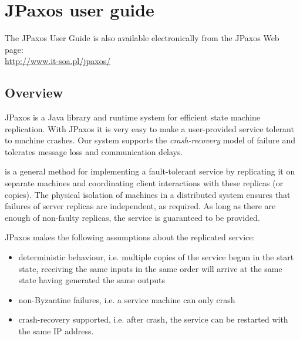 \chapter{JPaxos user guide}

The JPaxos User Guide is also available electronically from the JPaxos Web page:\\ \url{http://www.it-soa.pl/jpaxos/}

\section{Overview}
\label{overview:overview}\label{overview::doc}\label{overview:jpaxos-user-guide}
JPaxos is a Java library and runtime system for efficient state machine
replication. \linebreak With JPaxos it is very easy to make a user-provided
service tolerant to machine crashes. Our system supports the \emph{crash-recovery}
model of failure and tolerates message loss and communication delays.
\begin{description}
\item[{\href{http://en.wikipedia.org/wiki/State\_machine\_replication}{State machine replication}}] \leavevmode{}\label{overview:term-state-machine-replication}
is a general method for implementing a fault-tolerant service by
replicating it on separate machines and coordinating client interactions
with these replicas (or copies). The physical isolation of machines in
a distributed system ensures that failures of server replicas are
independent, as required. \linebreak As long as there are enough of non-faulty
replicas, the service is guaranteed to be provided.

\end{description}

JPaxos makes the following assumptions about the replicated service:
\begin{itemize}
\item {} 
deterministic behaviour, i.e. multiple copies of the service begun in
the start state, receiving the same inputs in the same order will
arrive at the same state having generated the same outputs

\item {} 
non-Byzantine failures, i.e. a service machine can only crash

\item {} 
crash-recovery supported, i.e. after crash, the service can be restarted
with the same IP address.

\end{itemize}

